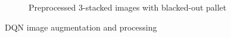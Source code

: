\begin{figure}[!htb]
\begin{subfigure}{0.49\textwidth}
        \caption{Preprocessed 3-stacked images with blacked-out pallet}
        \label{fig-bw}
    \end{subfigure}
    \caption{DQN image augmentation and processing}
    \label{fig-small}
    \label{fig-process}
\end{figure}